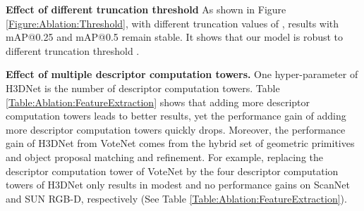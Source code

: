 \noindent\textbf{Effect of different truncation threshold} As shown in Figure \ref{Figure:Ablation:Threshold}, with different truncation values of , results with mAP@0.25 and mAP@0.5 remain stable. It shows that our model is robust to different truncation threshold . 

\noindent\textbf{Effect of multiple descriptor computation towers.} One hyper-parameter of H3DNet is the number of descriptor computation towers. Table \ref{Table:Ablation:FeatureExtraction} shows that adding more descriptor computation towers leads to better results, yet the performance gain of adding more descriptor computation towers quickly drops. Moreover, the performance gain of H3DNet from VoteNet comes from the hybrid set of geometric primitives and object proposal matching and refinement. For example, replacing the descriptor computation tower of VoteNet by the four descriptor computation towers of H3DNet only results in modest and no performance gains on ScanNet and SUN RGB-D, respectively (See Table \ref{Table:Ablation:FeatureExtraction}). 

